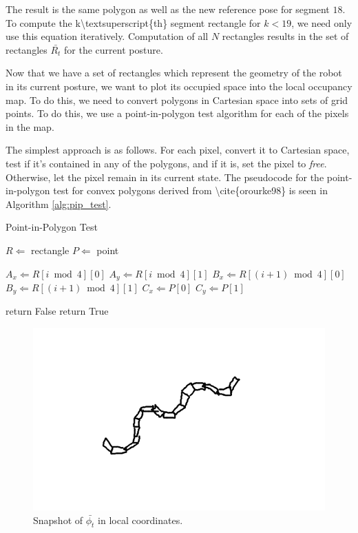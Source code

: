 The result is the same polygon as well as the new reference pose for segment $18$. To compute the k\textbackslash{}textsuperscript\{th\} segment rectangle for $k < 19$, we need only use this equation iteratively. Computation of all $N$ rectangles results in the set of rectangles $\bar{R_t}$ for the current posture.

Now that we have a set of rectangles which represent the geometry of the robot in its current posture, we want to plot its occupied space into the local occupancy map. To do this, we need to convert polygons in Cartesian space into sets of grid points. To do this, we use a point-in-polygon test algorithm for each of the pixels in the map.

The simplest approach is as follows. For each pixel, convert it to Cartesian space, test if it's contained in any of the polygons, and if it is, set the pixel to \emph{free}. Otherwise, let the pixel remain in its current state. The pseudocode for the point-in-polygon test for convex polygons derived from \textbackslash{}cite\{orourke98\} is seen in Algorithm \autoref{alg:pip_test}.


\begin{algorithm}
\caption{Point-in-Polygon Test}          %
\label{alg:pip_test}
\begin{algorithmic}

\State $R \Leftarrow $ rectangle
\State $P \Leftarrow $ point

\State $A_x \Leftarrow R[i \bmod 4][0] $
\State $A_y \Leftarrow R[i \bmod 4][1] $
\State $B_x \Leftarrow R[(i+1) \bmod 4][0] $
\State $B_y \Leftarrow R[(i+1) \bmod 4][1] $
\State $C_x \Leftarrow P[0] $
\State $C_y \Leftarrow P[1] $

\State return False
\EndIf
\EndFor
\State return True

\end{algorithmic}
\end{algorithm}


\begin{figure}[htbp]
\centering
\includegraphics[keepaspectratio,width=400pt,height=0.75\textheight]{4_snapshot_1.png}
\caption{Snapshot of $\bar{\phi_t}$ in local coordinates.}
\label{snapshot}
\end{figure}



